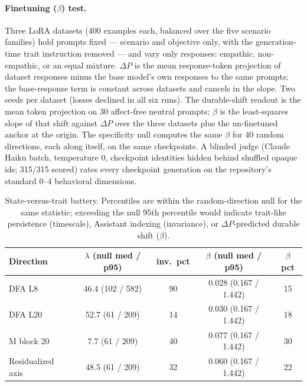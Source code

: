 \documentclass[10pt,twocolumn]{article}
\begin{document}
\paragraph{Finetuning ($\beta$) test.}
Three LoRA datasets (400 examples each, balanced over the five scenario
families) hold prompts fixed --- scenario and objective only, with the
generation-time trait instruction removed --- and vary only responses:
empathic, non-empathic, or an equal mixture. $\Delta P$ is the mean
response-token projection of dataset responses minus the base model's own
responses to the same prompts; the base-response term is constant across
datasets and cancels in the slope. Two seeds per dataset
(losses declined in all six runs). The durable-shift readout is the mean
token projection on 30 affect-free neutral prompts;
$\beta$ is the least-squares slope of that shift against $\Delta P$ over the
three datasets plus the un-finetuned anchor at the origin. The specificity
null computes the same $\beta$ for 40 random directions, each along itself,
on the same checkpoints. A blinded judge (Claude Haiku batch, temperature 0,
checkpoint identities hidden behind shuffled opaque ids; 315/315 scored)
rates every checkpoint generation on the repository's standard 0--4
behavioral dimensions.

\begin{table}[h]
\centering
\caption{State-versus-trait battery. Percentiles are within the
random-direction null for the same statistic; exceeding the null 95th
percentile would indicate trait-like persistence (timescale), Assistant
indexing (invariance), or $\Delta P$-predicted durable shift ($\beta$).}
\label{tab:state-trait}
\small
\begin{tabular}{lcccc}
\toprule
Direction & $\lambda$ (null med / p95) & inv.\ pct & $\beta$ (null med / p95) & $\beta$ pct \\
\midrule
DFA L8            & 46.4 (102 / 582)  & 90 & 0.028 (0.167 / 1.442) & 15 \\
DFA L20           & 52.7 (61 / 209)   & 14 & 0.030 (0.167 / 1.442) & 18 \\
M block 20        & 7.7 (61 / 209)    & 40 & 0.077 (0.167 / 1.442) & 30 \\
Residualized axis & 48.5 (61 / 209)   & 32 & 0.060 (0.167 / 1.442) & 22 \\
\bottomrule
\end{tabular}
\end{table}
\end{document}
